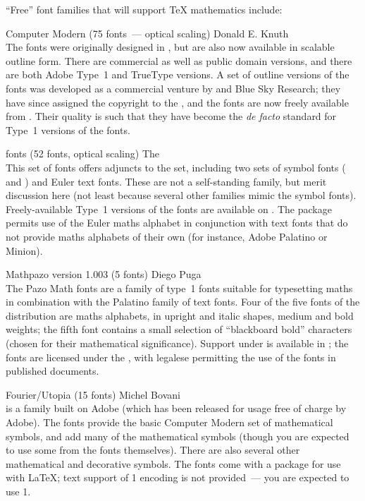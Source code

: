``Free'' font families that will support \TeX{} mathematics include:
\begin{booklist}
\item[Computer Modern](75 fonts~--- optical scaling) Donald E. Knuth\\
  The  fonts were originally designed in \MF{}, but are also
  now available in scalable outline form.  There are commercial as
  well as public domain versions, and there are both Adobe Type~1 and
  TrueType versions.  A set of outline versions of the fonts was
  developed as a commercial venture by \YandY{} and Blue Sky Research;
  they have since assigned the copyright to the , and the
  fonts are now freely available from .  Their quality is
  such that they have become the \emph{de facto} standard for Type~1
  versions of the fonts.

\item[\acro{AMS} fonts](52 fonts, optical scaling) The \\
  This set of fonts offers adjuncts to the  set, including
  two sets of symbol fonts ( and ) and
  Euler text fonts.
  These are not a self-standing family, but merit discussion here (not
  least because several other families mimic the symbol fonts).
  Freely-available Type~1 versions of the fonts are available on
  .  The  package permits use
  of the Euler maths alphabet in conjunction with text fonts that do
  not provide maths alphabets of their own (for instance, Adobe
  Palatino or Minion).

\item[Mathpazo version 1.003](5 fonts) Diego Puga\\
  The Pazo Math fonts are a family of type~1 fonts suitable for
  typesetting maths in combination with the Palatino family of text
  fonts.  Four of the five fonts of the distribution are maths
  alphabets, in upright and italic shapes, medium and bold weights;
  the fifth font contains a small selection of ``blackboard bold''
  characters (chosen for their mathematical significance).  Support
  under \LaTeXe{} is available in 
  ; the fonts are
  licensed under the , with legalese permitting the use of
  the fonts in published documents.

\item[Fourier/Utopia](15 fonts) Michel Bovani\\
   is a family built on Adobe 
  (which has been released for usage free of charge by Adobe).  The
  fonts provide the basic Computer Modern set of mathematical symbols,
  and add many of the  mathematical symbols (though you are
  expected to use some from the  fonts themselves).  There
  are also several other mathematical and decorative symbols.  The
  fonts come with a  package for use with \LaTeX{};
  text support of 1 encoding is not provided~--- you are
  expected to use 1.


\end{booklist}
